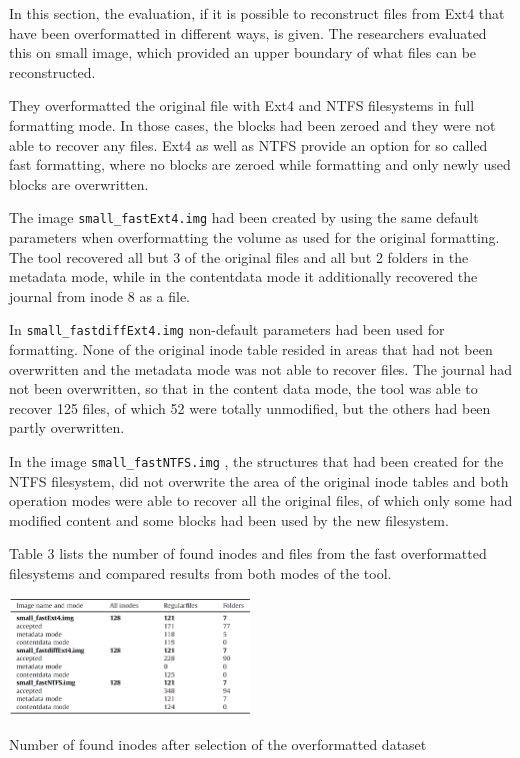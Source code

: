 \documentclass{acm_proc_article-sp}
\begin{document}
In this section, the evaluation, if it is possible to reconstruct files from Ext4 that have been overformatted in different ways, is given. The researchers evaluated this on small image, which provided an upper boundary of what files can be reconstructed.

They overformatted the original file with Ext4 and NTFS filesystems in full formatting mode. In those cases, the blocks had been zeroed and they were not able to recover any files. Ext4 as well as NTFS provide an option for so called fast formatting, where no blocks are zeroed while formatting and only newly used blocks are overwritten.

The image \texttt{small\_fastExt4.img} 
 had been created by using the same default parameters when overformatting the volume as used for the original formatting. The tool recovered all but 3 of the original files and all but 2 folders in the metadata mode, while in the contentdata mode it additionally recovered the journal from inode 8 as a file.

In \texttt{small\_fastdiffExt4.img} non-default parameters had been used 
 for formatting. None of the original inode table resided in areas that had not been overwritten and the metadata mode was not able to recover files. The journal had not been overwritten, so that in the content data mode, the tool was able to recover 125 files, of which 52 were totally unmodified, but the others had been partly overwritten.

In the image 
\texttt{small\_fastNTFS.img}
, the structures that had been created for the NTFS filesystem, did not overwrite the area of the original inode tables and both operation modes were able to recover all the original files, of which only some had modified content and some blocks had been used by the new filesystem.

Table 3 lists the number of found inodes and files from the fast overformatted filesystems and compared results from both modes of the tool.

\begin{table}
\centering
\includegraphics[width=0.48\textwidth]{images/number.png}
	\caption{Number of found inodes after selection of the overformatted dataset}
\end{table}
\end{document}
